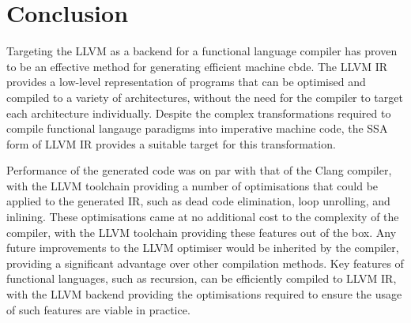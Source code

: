 \chapter{Conclusion}
\label{ch:conclusion}

Targeting the LLVM as a backend for a functional language compiler has proven to be an effective
method for generating efficient machine cbde. The LLVM IR provides a low-level representation of
programs that can be optimised and compiled to a variety of architectures, without the need for the
compiler to target each architecture individually. Despite the complex transformations required to
compile functional langauge paradigms into imperative machine code, the SSA form of LLVM IR provides
a suitable target for this transformation.

Performance of the generated code was on par with that of the Clang compiler, with the LLVM
toolchain providing a number of optimisations that could be applied to the generated IR, such as
dead code elimination, loop unrolling, and inlining. These optimisations came at no additional cost
to the complexity of the compiler, with the LLVM toolchain providing these features out of the box.
Any future improvements to the LLVM optimiser would be inherited by the compiler, providing a
significant advantage over other compilation methods. Key features of functional languages, such as
recursion, can be efficiently compiled to LLVM IR, with the LLVM backend providing the optimisations
required to ensure the usage of such features are viable in practice.


